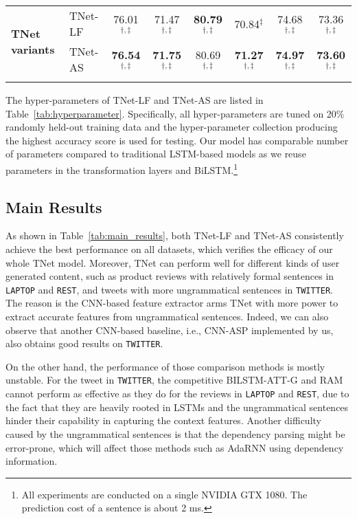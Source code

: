 \documentclass[11pt,a4paper]{article}
\begin{document}
\begin{table*}[!t]
{\begin{tabular}{llcccccc}
        \multirow{2}{*}{\textbf{TNet variants}}& TNet-LF & 76.01$^{\dag,\ddag}$ & 71.47$^{\dag,\ddag}$ & \textbf{80.79}$^{\dag,\ddag}$ & 70.84$^{\ddag}$ & 74.68$^{\dag,\ddag}$ & 73.36$^{\dag,\ddag}$ \\ 
        & TNet-AS & \textbf{76.54}$^{\dag,\ddag}$ & \textbf{71.75}$^{\dag,\ddag}$ & 80.69$^{\dag,\ddag}$ & \textbf{71.27}$^{\dag,\ddag}$ & \textbf{74.97}$^{\dag,\ddag}$ & \textbf{73.60}$^{\dag,\ddag}$ \\ 
    \Xhline{3\arrayrulewidth}
    \end{tabular}}
    \caption{Experimental results (\%). The results with symbol``$\natural$'' are retrieved from the original papers, and those starred ($*$) one are from~\citet{dong-EtAl:2014:P14-2}. The marker $^{\dag}$ refers to $p$-value $<$ 0.01 when comparing with BILSTM-ATT-G, while the marker $^{\ddag}$ refers to $p$-value $<$ 0.01 when comparing with RAM. }\label{tab:main_results}
\end{table*}

The hyper-parameters of TNet-LF and TNet-AS are listed in Table~\ref{tab:hyperparameter}. Specifically, all hyper-parameters are tuned on 20\% randomly held-out training data 
and the hyper-parameter collection producing the highest accuracy score is used for testing. 
Our model has comparable number of parameters compared to traditional LSTM-based models as we reuse parameters in the transformation layers and BiLSTM.\footnote{All experiments are conducted on a single NVIDIA GTX 1080. The prediction cost of a sentence is about 2 ms.}


\subsection{Main Results}
As shown in Table~\ref{tab:main_results}, both TNet-LF and TNet-AS consistently achieve the best performance on all datasets, which verifies the efficacy of our whole TNet model. Moreover, TNet can perform well for different kinds of user generated content, such as product reviews with relatively formal sentences in \texttt{LAPTOP} and \texttt{REST}, and tweets with more ungrammatical sentences in \texttt{TWITTER}. The reason is the CNN-based feature extractor arms TNet with more power to extract accurate features from ungrammatical sentences. Indeed, we can also observe that another CNN-based baseline, i.e., CNN-ASP implemented by us, also obtains good results on \texttt{TWITTER}. 




On the other hand, the performance of those comparison methods is mostly unstable. For the tweet in \texttt{TWITTER}, the competitive BILSTM-ATT-G and RAM cannot perform as effective as they do for the reviews in \texttt{LAPTOP} and \texttt{REST}, due to the fact that they are heavily rooted in LSTMs and the ungrammatical sentences hinder their capability in capturing the context features. Another difficulty caused by the ungrammatical sentences is that the dependency parsing might be error-prone, which will affect those methods such as AdaRNN using dependency information.
\end{document}
